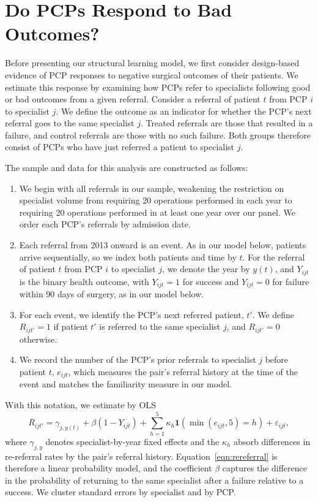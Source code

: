 \documentclass[12pt]{article}
\begin{document}

\section{Do PCPs Respond to Bad Outcomes?}
\label{sec:reduced_form}

Before presenting our structural learning model, we first consider design-based evidence of PCP responses to negative surgical outcomes of their patients. We estimate this response by examining how PCPs refer to specialists following good or bad outcomes from a given referral. Consider a referral of patient $t$ from PCP $i$ to specialist $j$. We define the outcome as an indicator for whether the PCP's next referral goes to the same specialist $j$. Treated referrals are those that resulted in a failure, and control referrals are those with no such failure. Both groups therefore consist of PCPs who have just referred a patient to specialist $j$.

The sample and data for this analysis are constructed as follows:
\begin{enumerate}
\item We begin with all referrals in our sample, weakening the restriction on specialist volume from requiring 20 operations performed in each year to requiring 20 operations performed in at least one year over our panel. We order each PCP's referrals by admission date.

\item Each referral from 2013 onward is an event. As in our model below, patients arrive sequentially, so we index both patients and time by $t$. For the referral of patient $t$ from PCP $i$ to specialist $j$, we denote the year by $y(t)$, and $Y_{ijt}$ is the binary health outcome, with $Y_{ijt}=1$ for success and $Y_{ijt}=0$ for failure within 90 days of surgery, as in our model below.

\item For each event, we identify the PCP's next referred patient, $t'$. We define $R_{ijt'} = 1$ if patient $t'$ is referred to the same specialist $j$, and $R_{ijt'} = 0$ otherwise.

\item We record the number of the PCP's prior referrals to specialist $j$ before patient $t$, $e_{ijt}$, which measures the pair's referral history at the time of the event and matches the familiarity measure in our model.
\end{enumerate}
With this notation, we estimate by OLS
\begin{equation}
  R_{ijt'} = \gamma_{j,y(t)} + \beta (1-Y_{ijt}) + \sum_{h=1}^{5} \kappa_h \mathbf{1}\left(\min(e_{ijt},5)=h\right) + \varepsilon_{ijt},
  \label{eqn:rereferral}
\end{equation}
where $\gamma_{j,y}$ denotes specialist-by-year fixed effects and the $\kappa_h$ absorb differences in re-referral rates by the pair's referral history. Equation~\eqref{eqn:rereferral} is therefore a linear probability model, and the coefficient $\beta$ captures the difference in the probability of returning to the same specialist after a failure relative to a success. We cluster standard errors by specialist and by PCP.
\end{document}
